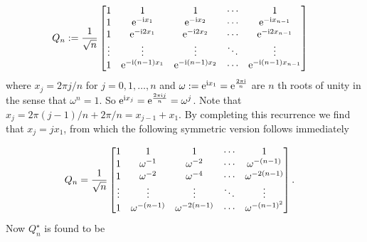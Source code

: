 \documentclass[12pt,a4paper]{article}
\begin{document}
\begin{align*}
Q_n &:= {1 \over \ensuremath{\sqrt}n} \begin{bmatrix} 1 & 1 & 1&  \ensuremath{\cdots} & 1 \\
                                    1 & {\rm e}^{-{\rm i} x_1} & {\rm e}^{-{\rm i} x_2} & \ensuremath{\cdots} & {\rm e}^{-{\rm i} x_{n-1}} \\
                                    1 & {\rm e}^{-{\rm i} 2 x_1} & {\rm e}^{-{\rm i} 2 x_2} & \ensuremath{\cdots} & {\rm e}^{-{\rm i} 2x_{n-1}} \\
                                    \ensuremath{\vdots} & \ensuremath{\vdots} & \ensuremath{\vdots} & \ensuremath{\ddots} & \ensuremath{\vdots} \\
                                    1 & {\rm e}^{-{\rm i} (n-1) x_1} & {\rm e}^{-{\rm i} (n-1) x_2} & \ensuremath{\cdots} & {\rm e}^{-{\rm i} (n-1) x_{n-1}}
\end{bmatrix}
\end{align*}
where $x_j = 2\ensuremath{\pi}j/n$ for $j = 0,1,\ensuremath{\ldots},n$ and $\ensuremath{\omega} := {\rm e}^{{\rm i} x_1} = {\rm e}^{2 \ensuremath{\pi} {\rm i} \over n}$ are $n$ th roots of unity in the sense that $\ensuremath{\omega}^n = 1$. So ${\rm e}^{{\rm i} x_j} ={\rm e}^{2 \ensuremath{\pi} {\rm i} j \over n}= \ensuremath{\omega}^j$. Note that $x_j = 2\ensuremath{\pi}(j-1)/n+2\ensuremath{\pi}/n = x_{j-1} + x_1$. By completing this recurrence we find that $x_j = jx_1$, from which the following symmetric version follows immediately


\begin{align*}
Q_n 
&= {1 \over \sqrt{n}} \begin{bmatrix} 1 & 1 & 1&  \ensuremath{\cdots} & 1 \\
                                    1 & \ensuremath{\omega}^{-1} & \ensuremath{\omega}^{-2} & \ensuremath{\cdots} & \ensuremath{\omega}^{-(n-1)}\\
                                    1 & \ensuremath{\omega}^{-2} & \ensuremath{\omega}^{-4} & \ensuremath{\cdots} & \ensuremath{\omega}^{-2(n-1)}\\
                                    \ensuremath{\vdots} & \ensuremath{\vdots} & \ensuremath{\vdots} & \ensuremath{\ddots} & \ensuremath{\vdots} \\
                                    1 & \ensuremath{\omega}^{-(n-1)} & \ensuremath{\omega}^{-2(n-1)} & \ensuremath{\cdots} & \ensuremath{\omega}^{-(n-1)^2}
\end{bmatrix}.
\end{align*}
Now $Q_n^\ensuremath{\star}$ is found to be
\end{document}

